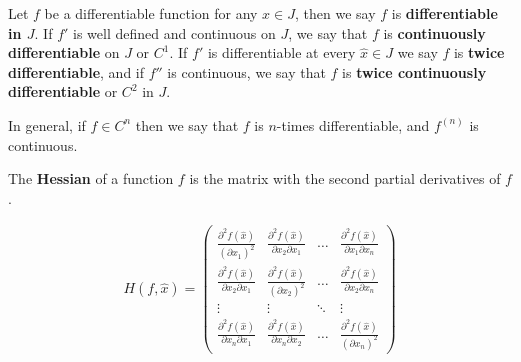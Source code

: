 \documentclass[aspectratio=169]{beamer}
\begin{document}
\begin{frame}
	\begin{definition}
		Let $f$ be a differentiable function for any $x\in J$, then we say $f$ is \textbf{differentiable in $J$}. If $ f'$ is well defined and continuous on $J$, we say that $f$ is \textbf{continuously differentiable} on $J$ or $C^1$. If $f'$ is differentiable at every $\hat{x}\in J$ we say $f$ is \textbf{twice differentiable}, and if $f''$ is continuous, we say that $f$ is \textbf{twice continuously differentiable} or  $C^2$ in $J$.

\vspace{1em}

In general, if $f\in C^n$ then we say that $f$ is $n$-times differentiable, and $f^{(n)}$ is continuous.
	\end{definition}
\end{frame}


\begin{frame}
    \begin{definition}
        The \textbf{Hessian} of a function $f$ is the matrix with the second partial derivatives of $f$.
        
        \begin{align*}
            H(f,\hat{x})=\left(
            \begin{array}{cccc}
                \frac{\partial^2f(\hat{x})}{(\partial x_1)^2} & \frac{\partial^2f(\hat{x})}{\partial x_2\partial x_1}&\ldots&\frac{\partial^2f(\hat{x})}{\partial x_1\partial x_n}\\
                \frac{\partial^2f(\hat{x})}{\partial x_2\partial x_1} & \frac{\partial^2f(\hat{x})}{(\partial x_2)^2} & \ldots & \frac{\partial^2f(\hat{x})}{\partial x_2\partial x_n}\\
                \vdots & \vdots &\ddots & \vdots\\
                \frac{\partial^2f(\hat{x})}{\partial x_n\partial x_1} & \frac{\partial^2f(\hat{x})}{\partial x_n\partial x_2}&\ldots &\frac{\partial^2f(\hat{x})}{(\partial x_n)^2}
            \end{array}
            \right)
        \end{align*}
        
    \end{definition}
\end{frame}
\end{document}
